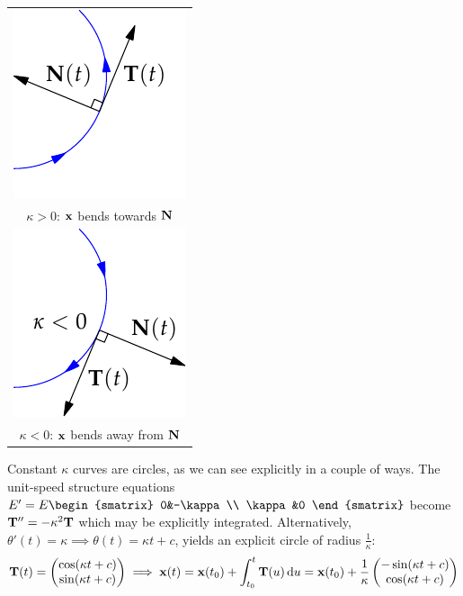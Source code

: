 \begin{minipage}[t]{0.34\linewidth}\vspace{-8pt}
	\flushright
	\begin{tabular}{c@{}}
		\includegraphics{fund-e2}\\
		$\kappa>0$: ${\mathbf{x}}$ bends towards ${\mathbf{N}}$\\[10pt]
		\includegraphics{fund-e2a}\\
		$\kappa<0$: ${\mathbf{x}}$ bends away from ${\mathbf{N}}$
	\end{tabular}
\end{minipage}


\begin{example}{}{}
	Constant $\kappa$ curves are circles, as we can see explicitly in a couple of ways. The unit-speed structure equations $E'=E\begin{smatrix}
		0&-\kappa\\
		\kappa&0
	\end{smatrix}$ become ${\mathbf{T}}''=-\kappa^2{\mathbf{T}}$ which may be explicitly integrated. Alternatively, $\theta'(t)=\kappa\implies \theta(t)=\kappa t+c$, yields an explicit circle of radius $\frac 1\kappa$:
	\[
		{\mathbf{T}}(t)=\begin{pmatrix}\cos(\kappa t+c)\\\sin(\kappa t+c)\end{pmatrix}\implies {\mathbf{x}}(t)={\mathbf{x}}(t_0)+\int_{t_0}^t{\mathbf{T}}(u)\,{\mathrm{d} u} ={\mathbf{x}}(t_0)+\frac 1\kappa\begin{pmatrix}-\sin(\kappa t+c)\\\cos(\kappa t+c)\end{pmatrix}
	\]
\end{example}


